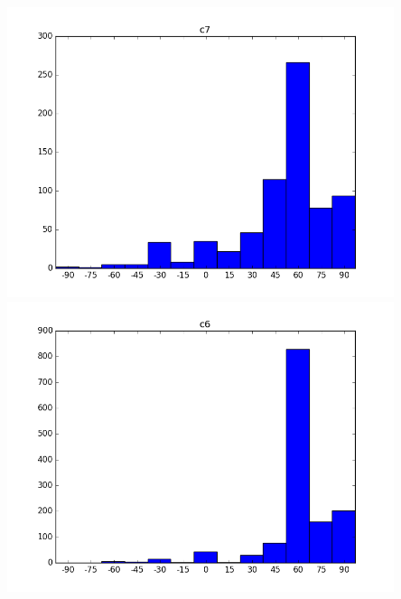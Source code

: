 \documentclass{beamer}
\begin{document}
\begin{frame}
\begin{columns}
\begin{column}{0.5\textwidth}
\begin{center}
		 			\includegraphics[width=0.85\textwidth]{headpose_evaluation_c7}\\
		 			\includegraphics[width=0.85\textwidth]{headpose_evaluation_c6}
		 		\end{center}
		 	\end{column}
		 \end{columns}
		
	\end{frame}
		
\end{document}
